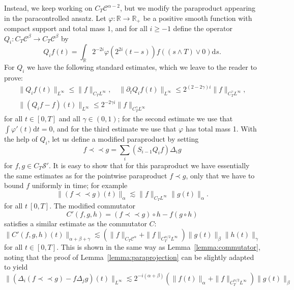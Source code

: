 \documentclass[11pt,a4paper]{article}
\newcommand{\mathd}{\mathrm{d}}
\newcommand{\precprec}{\prec\!\!\!\prec}
\theoremstyle{remark}
\newcommand{\CC}{\ensuremath{\mathscr{C}}}
\newcommand{\CS}{\ensuremath{\mathscr{S}}}
\begin{document}
Instead, we keep working on $C_{T} \CC^{\alpha -2}$, but we modify the paraproduct
appearing in the paracontrolled ansatz. Let $\varphi \colon \mathbb{R} \rightarrow \mathbb{R}_{+}$ be a positive smooth function with compact support and total
mass $1$, and for all $i \geqslant -1$ define the operator $Q_{i} \colon C_{T} \CC^{\beta} \rightarrow C_{T} \CC^{\beta}$ by
\[
   Q_{i} f ( t ) = \int_{\mathbb{R}} 2^{-2i} \varphi ( 2^{2i} ( t-s ) ) f ( (s \wedge T ) \vee 0 ) \mathd s.
\]
For $Q_{i}$ we have the following standard estimates, which we leave to the reader to prove:
\begin{gather}\label{eq:Q-bounds}
   \| Q_{i} f ( t ) \|_{L^{\infty}} \leqslant \| f \|_{C_{T} L^{\infty}} , \hspace{1em} \| \partial_{t} Q_{i} f ( t ) \|_{L^{\infty}} \leqslant 2^{( 2-2 \gamma ) i} \| f \|_{C_{T}^{\gamma} L^{\infty}}, \\ \nonumber
   \| ( Q_{i} f-f ) ( t ) \|_{L^{\infty}} \leqslant 2^{-2 \gamma i} \| f \|_{C_{T}^{\gamma} L^{\infty}}
\end{gather}
for all $t \in [ 0,T ]$ and all $\gamma \in ( 0,1 )$; for the second estimate
we use that $\int \varphi' ( t ) \mathd t=0$, and for the third estimate we
use that $\varphi$ has total mass 1.
With the help of $Q_{i}$, let us define a modified paraproduct by setting
\[
   f \precprec g= \sum_{i} ( S_{i-1} Q_{i} f ) \Delta_{i} g
\]
for $f,g \in C_{T} \CS'$. It is easy to show that for this paraproduct we have
essentially the same estimates as for the pointwise paraproduct $f \prec g$,
only that we have to bound $f$ uniformly in time; for example
\[
   \| ( f \precprec g ) ( t ) \|_{\alpha} \lesssim \| f \|_{C_{T} L^{\infty}} \| g ( t ) \|_{\alpha} .
\]
for all $t \ [0,T]$. The modified commutator
\[
   C' ( f,g,h ) = ( f \precprec g ) \circ h-f ( g \circ h )
\]
satisfies a similar estimate as the commutator $C$:
\begin{equation}\label{eq:mod commutator}
   \| C' ( f,g,h ) ( t ) \|_{\alpha + \beta + \gamma} \lesssim ( \| f \|_{C_{T} \CC^\alpha} + \| f \|_{C^{\alpha /2}_{T} L^{\infty}} ) \| g ( t ) \|_{\beta} \| h ( t ) \|_{\gamma}
\end{equation}
for all $t \in [ 0,T ]$. This is shown in the same way as
Lemma~\ref{lemma:commutator}, noting that the proof of
Lemma~\ref{lemma:paraprojection} can be slightly adapted to yield
\[
   \| ( \Delta_{i} ( f \precprec g ) -f \Delta_{j} g ) ( t ) \|_{L^{\infty}} \lesssim 2^{-i ( \alpha + \beta )} ( \| f ( t ) \|_{\alpha} + \| f \|_{C^{\alpha /2}_{T} L^{\infty}} ) \| g ( t ) \|_{\beta}
\]
\end{document}
